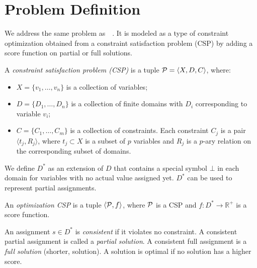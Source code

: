 \section{Problem Definition}
\label{sec::problem}


We address the same problem as~\citeauthor{DBLP:conf/socs/BoteaB21}~.
It is modeled as a type of constraint optimization obtained from a
constraint satisfaction problem (CSP) by adding a score function on partial
or full solutions.

\bdf
A \emph{constraint satisfaction problem (CSP)} is a tuple ${\cal P} = \langle X, D, C \rangle$,
where:
\begin{itemize} 
\item $X = \{v_1, \dots, v_n\}$ is a collection of variables;
\item $D = \{D_1, \dots, D_n\}$ is a collection of finite domains with $D_i$ corresponding to variable $v_i$;
\item $C = \{C_1, \dots, C_m\}$ is a collection of constraints. Each constraint $C_j$ is a pair $\langle t_j, R_j \rangle$, where $t_j \subset X$ is a subset of $p$ variables and $R_j$ is a $p$-ary relation on the corresponding subset of domains.
\end{itemize}
\edf

\noindent We define $D^*$ as an extension of $D$ that contains a special symbol $\bot$ in each domain for variables with no actual value assigned yet. $D^*$ can be used to represent partial assignments.

\bdf
An \emph{optimization CSP} is a tuple $\langle {\cal P}, f \rangle$, 
where ${\cal P}$ is a CSP and 
$f : D^* \rightarrow \mathbb{R}^+$ is a score function.
\edf

An assignment $s \in D^*$ is {\em consistent} if 
it violates no constraint.
A consistent partial assignment is called a {\em partial solution}.
A consistent full assignment is a {\em full solution} (shorter, solution).
A solution is optimal if no solution has a higher score.
